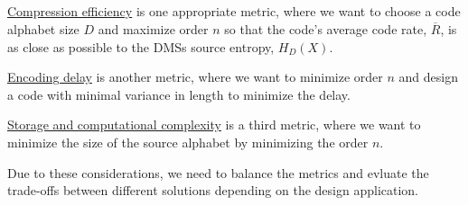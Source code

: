 \documentclass[
  coursecode={MTHE 474},
  assignmentname={Homework \homeworknumber},
  studentnumber=20053722,
  name={Bryan Hoang},
  draft,
]{
  ltxanswer%
}
\begin{document}
\begin{questions}
\begin{parts}
      \part{}
      \begin{solution}
        \underline{Compression efficiency} is one appropriate metric, where we want to choose a code alphabet size \(D\) and maximize order \(n\) so that the code's average code rate, \(\overline{R}\), is as close as possible to the DMSs source entropy, \(H_{D}(X)\).

        \underline{Encoding delay} is another metric, where we want to minimize order \(n\) and design a code with minimal variance in length to minimize the delay.

        \underline{Storage and computational complexity} is a third metric, where we want to minimize the size of the source alphabet by minimizing the order \(n\).

        Due to these considerations, we need to balance the metrics and evluate the trade-offs between different solutions depending on the design application.
      \end{solution}
    \end{parts}
  \end{questions}
\end{document}
